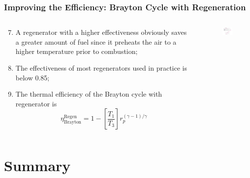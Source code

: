 \documentclass[10pt,compress]{beamer}
\newcommand{\frc}{\displaystyle\frac}
\begin{document}
\begin{frame}
 \frametitle{Improving the Efficiency: Brayton Cycle with Regeneration}
 \begin{columns}
   \begin{column}[c]{0.5\linewidth} 
      \begin{enumerate}[(1)]\setcounter{enumi}{6}\scriptsize
        \item<1-> A regenerator with a higher effectiveness obviously saves a greater amount of fuel since it preheats the air to a higher temperature prior to combustion;
        \item<1-> The effectiveness of most regenerators used in practice is below 0.85;
        \item<2-> The thermal efficiency of the Brayton cycle with regenerator is
           \begin{equation}
             \eta_{\text{Brayton}}^{\text{Regen}}= 1 - \left[\frc{T_{1}}{T_{3}}\right] r_{p}^{\left(\gamma-1\right)/\gamma}
          \end{equation}
       \end{enumerate}
  \end{column}
  \begin{column}[c]{0.5\linewidth}
    \begin{center}
   \begin{figure}%
     \includegraphics[height=5.cm,width=4.5cm,clip]{./Pics/Brayton_cycle4}
   \end{figure}  
    \end{center}
  \end{column}  
 \end{columns}
\end{frame}


\section{Summary}
\end{document}
